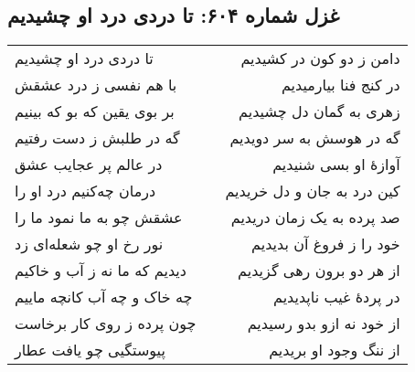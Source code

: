 \begin{center}
\section*{غزل شماره ۶۰۴: تا دردی درد او چشیدیم}
\label{sec:604}
\begin{longtable}{l p{0.5cm} r}
تا دردی درد او چشیدیم
&&
دامن ز دو کون در کشیدیم
\\
با هم نفسی ز درد عشقش
&&
در کنج فنا بیارمیدیم
\\
بر بوی یقین که بو که بینیم
&&
زهری به گمان دل چشیدیم
\\
گه در طلبش ز دست رفتیم
&&
گه در هوسش به سر دویدیم
\\
در عالم پر عجایب عشق
&&
آوازهٔ او بسی شنیدیم
\\
درمان چه‌کنیم درد او را
&&
کین درد به جان و دل خریدیم
\\
عشقش چو به ما نمود ما را
&&
صد پرده به یک زمان دریدیم
\\
نور رخ او چو شعله‌ای زد
&&
خود را ز فروغ آن بدیدیم
\\
دیدیم که ما نه ز آب و خاکیم
&&
از هر دو برون رهی گزیدیم
\\
چه خاک و چه آب کانچه ماییم
&&
در پردهٔ غیب ناپدیدیم
\\
چون پرده ز روی کار برخاست
&&
از خود نه ازو بدو رسیدیم
\\
پیوستگیی چو یافت عطار
&&
از ننگ وجود او بریدیم
\\
\end{longtable}
\end{center}

